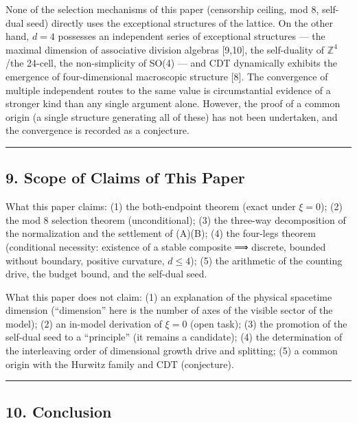 \documentclass[
]{ltjsarticle}
\begin{document}
None of the selection mechanisms of this paper (censorship ceiling, mod
8, self-dual seed) directly uses the exceptional structures of the
lattice. On the other hand, \(d=4\) possesses an independent series of
exceptional structures --- the maximal dimension of associative division
algebras {[}9,10{]}, the self-duality of \(\mathbb{Z}^4\)/the 24-cell,
the non-simplicity of SO(4) --- and CDT dynamically exhibits the
emergence of four-dimensional macroscopic structure {[}8{]}. The
convergence of multiple independent routes to the same value is
circumstantial evidence of a stronger kind than any single argument
alone. However, the proof of a common origin (a single structure
generating all of these) has not been undertaken, and the convergence is
recorded as a conjecture.

\begin{center}\rule{0.5\linewidth}{0.5pt}\end{center}

\subsection{9. Scope of Claims of This
Paper}\label{scope-of-claims-of-this-paper}

What this paper claims: (1) the both-endpoint theorem (exact under
\(\xi=0\)); (2) the mod 8 selection theorem (unconditional); (3) the
three-way decomposition of the normalization and the settlement of
(A)(B); (4) the four-legs theorem (conditional necessity: existence of a
stable composite ⟹ discrete, bounded without boundary, positive
curvature, \(d\le4\)); (5) the arithmetic of the counting drive, the
budget bound, and the self-dual seed.

What this paper does not claim: (1) an explanation of the physical
spacetime dimension (``dimension'' here is the number of axes of the
visible sector of the model); (2) an in-model derivation of \(\xi=0\)
(open task); (3) the promotion of the self-dual seed to a ``principle''
(it remains a candidate); (4) the determination of the interleaving
order of dimensional growth drive and splitting; (5) a common origin
with the Hurwitz family and CDT (conjecture).

\begin{center}\rule{0.5\linewidth}{0.5pt}\end{center}

\subsection{10. Conclusion}\label{conclusion}
\end{document}
